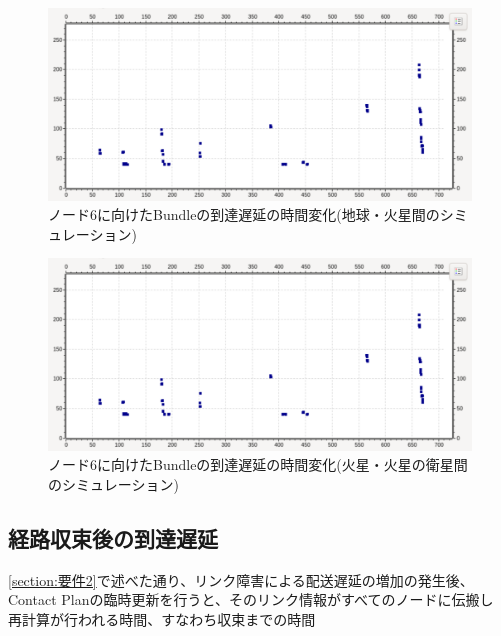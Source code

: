 \begin{figure}[tbh]
    \centering
    \includegraphics[width=0.7\textheight]{img/thesis_sample_delay_time.pdf}
    \caption{ノード6に向けたBundleの到達遅延の時間変化(地球・火星間のシミュレーション)}
    \label{fig:delay_time_variation_earth_mars}
    \begin{minipage}{\textwidth}
        \raggedright
    \end{minipage}
\end{figure}

\begin{figure}[tbh]
    \centering
    \includegraphics[width=0.7\textheight]{img/thesis_sample_delay_time.pdf}
    \caption{ノード6に向けたBundleの到達遅延の時間変化(火星・火星の衛星間のシミュレーション)}
    \label{fig:delay_time_variation_mars_marssat}
    \begin{minipage}{\textwidth}
        \raggedright
    \end{minipage}
\end{figure}

\subsection{経路収束後の到達遅延}
\label{section:経路収束後の到達遅延}
\ref{section:要件2}で述べた通り、リンク障害による配送遅延の増加の発生後、
Contact Planの臨時更新を行うと、そのリンク情報がすべてのノードに伝搬し
再計算が行われる時間、すなわち収束までの時間

